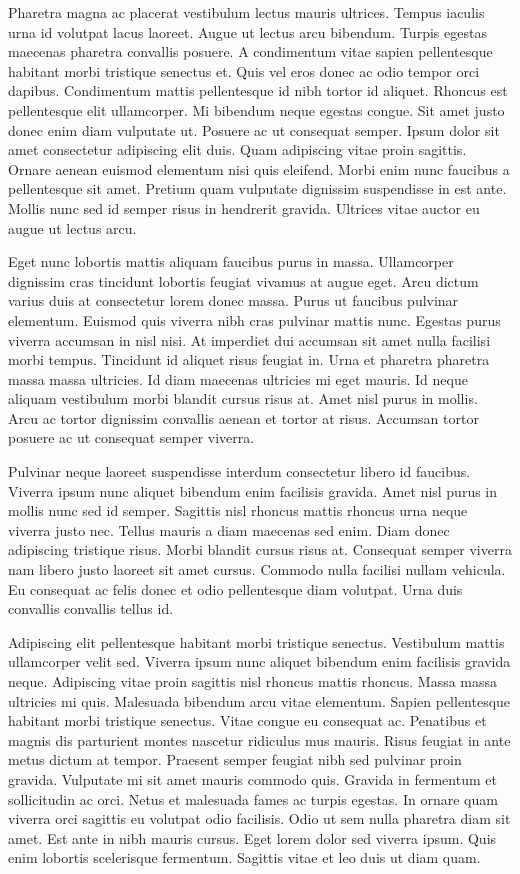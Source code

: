 \documentclass[11pt,a4paper]{article}
\begin{document}
Pharetra magna ac placerat vestibulum lectus mauris ultrices. Tempus iaculis urna id volutpat lacus laoreet. Augue ut lectus arcu bibendum. Turpis egestas maecenas pharetra convallis posuere. A condimentum vitae sapien pellentesque habitant morbi tristique senectus et. Quis vel eros donec ac odio tempor orci dapibus. Condimentum mattis pellentesque id nibh tortor id aliquet. Rhoncus est pellentesque elit ullamcorper. Mi bibendum neque egestas congue. Sit amet justo donec enim diam vulputate ut. Posuere ac ut consequat semper. Ipsum dolor sit amet consectetur adipiscing elit duis. Quam adipiscing vitae proin sagittis. Ornare aenean euismod elementum nisi quis eleifend. Morbi enim nunc faucibus a pellentesque sit amet. Pretium quam vulputate dignissim suspendisse in est ante. Mollis nunc sed id semper risus in hendrerit gravida. Ultrices vitae auctor eu augue ut lectus arcu.

Eget nunc lobortis mattis aliquam faucibus purus in massa. Ullamcorper dignissim cras tincidunt lobortis feugiat vivamus at augue eget. Arcu dictum varius duis at consectetur lorem donec massa. Purus ut faucibus pulvinar elementum. Euismod quis viverra nibh cras pulvinar mattis nunc. Egestas purus viverra accumsan in nisl nisi. At imperdiet dui accumsan sit amet nulla facilisi morbi tempus. Tincidunt id aliquet risus feugiat in. Urna et pharetra pharetra massa massa ultricies. Id diam maecenas ultricies mi eget mauris. Id neque aliquam vestibulum morbi blandit cursus risus at. Amet nisl purus in mollis. Arcu ac tortor dignissim convallis aenean et tortor at risus. Accumsan tortor posuere ac ut consequat semper viverra.

Pulvinar neque laoreet suspendisse interdum consectetur libero id faucibus. Viverra ipsum nunc aliquet bibendum enim facilisis gravida. Amet nisl purus in mollis nunc sed id semper. Sagittis nisl rhoncus mattis rhoncus urna neque viverra justo nec. Tellus mauris a diam maecenas sed enim. Diam donec adipiscing tristique risus. Morbi blandit cursus risus at. Consequat semper viverra nam libero justo laoreet sit amet cursus. Commodo nulla facilisi nullam vehicula. Eu consequat ac felis donec et odio pellentesque diam volutpat. Urna duis convallis convallis tellus id.

Adipiscing elit pellentesque habitant morbi tristique senectus. Vestibulum mattis ullamcorper velit sed. Viverra ipsum nunc aliquet bibendum enim facilisis gravida neque. Adipiscing vitae proin sagittis nisl rhoncus mattis rhoncus. Massa massa ultricies mi quis. Malesuada bibendum arcu vitae elementum. Sapien pellentesque habitant morbi tristique senectus. Vitae congue eu consequat ac. Penatibus et magnis dis parturient montes nascetur ridiculus mus mauris. Risus feugiat in ante metus dictum at tempor. Praesent semper feugiat nibh sed pulvinar proin gravida. Vulputate mi sit amet mauris commodo quis. Gravida in fermentum et sollicitudin ac orci. Netus et malesuada fames ac turpis egestas. In ornare quam viverra orci sagittis eu volutpat odio facilisis. Odio ut sem nulla pharetra diam sit amet. Est ante in nibh mauris cursus. Eget lorem dolor sed viverra ipsum. Quis enim lobortis scelerisque fermentum. Sagittis vitae et leo duis ut diam quam.
\end{document}

